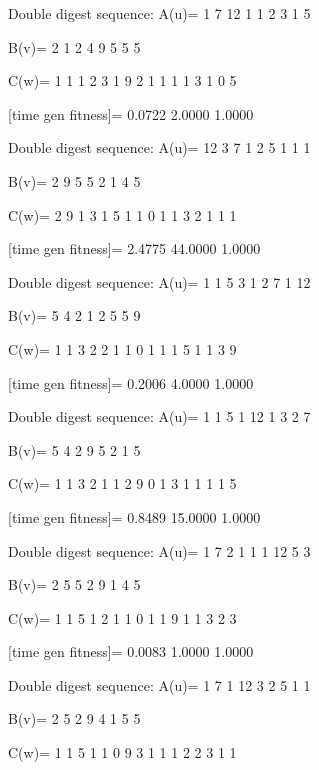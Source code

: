 Double digest sequence:
A(u)=
     1     7    12     1     1     2     3     1     5

B(v)=
     2     1     2     4     9     5     5     5

C(w)=
     1     1     1     2     3     1     9     2     1     1     1     1     3     1     0     5

[time gen fitness]=
    0.0722    2.0000    1.0000

Double digest sequence:
A(u)=
    12     3     7     1     2     5     1     1     1

B(v)=
     2     9     5     5     2     1     4     5

C(w)=
     2     9     1     3     1     5     1     1     0     1     1     3     2     1     1     1

[time gen fitness]=
    2.4775   44.0000    1.0000

Double digest sequence:
A(u)=
     1     1     5     3     1     2     7     1    12

B(v)=
     5     4     2     1     2     5     5     9

C(w)=
     1     1     3     2     2     1     1     0     1     1     1     5     1     1     3     9

[time gen fitness]=
    0.2006    4.0000    1.0000

Double digest sequence:
A(u)=
     1     1     5     1    12     1     3     2     7

B(v)=
     5     4     2     9     5     2     1     5

C(w)=
     1     1     3     2     1     1     2     9     0     1     3     1     1     1     1     5

[time gen fitness]=
    0.8489   15.0000    1.0000

Double digest sequence:
A(u)=
     1     7     2     1     1     1    12     5     3

B(v)=
     2     5     5     2     9     1     4     5

C(w)=
     1     1     5     1     2     1     1     0     1     1     9     1     1     3     2     3

[time gen fitness]=
    0.0083    1.0000    1.0000

Double digest sequence:
A(u)=
     1     7     1    12     3     2     5     1     1

B(v)=
     2     5     2     9     4     1     5     5

C(w)=
     1     1     5     1     1     0     9     3     1     1     1     2     2     3     1     1

